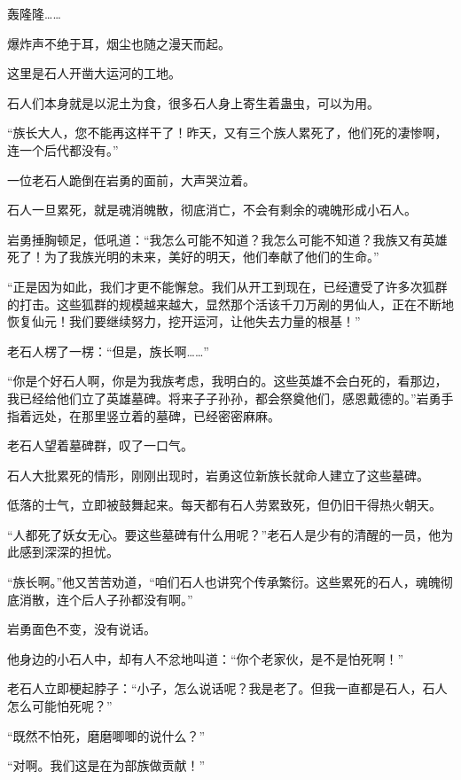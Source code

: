 
\begin{this_body}

轰隆隆……

爆炸声不绝于耳，烟尘也随之漫天而起。

这里是石人开凿大运河的工地。

石人们本身就是以泥土为食，很多石人身上寄生着蛊虫，可以为用。

“族长大人，您不能再这样干了！昨天，又有三个族人累死了，他们死的凄惨啊，连一个后代都没有。”

一位老石人跪倒在岩勇的面前，大声哭泣着。

石人一旦累死，就是魂消魄散，彻底消亡，不会有剩余的魂魄形成小石人。

岩勇捶胸顿足，低吼道：“我怎么可能不知道？我怎么可能不知道？我族又有英雄死了！为了我族光明的未来，美好的明天，他们奉献了他们的生命。”

“正是因为如此，我们才更不能懈怠。我们从开工到现在，已经遭受了许多次狐群的打击。这些狐群的规模越来越大，显然那个活该千刀万剐的男仙人，正在不断地恢复仙元！我们要继续努力，挖开运河，让他失去力量的根基！”

老石人楞了一楞：“但是，族长啊……”

“你是个好石人啊，你是为我族考虑，我明白的。这些英雄不会白死的，看那边，我已经给他们立了英雄墓碑。将来子子孙孙，都会祭奠他们，感恩戴德的。”岩勇手指着远处，在那里竖立着的墓碑，已经密密麻麻。

老石人望着墓碑群，叹了一口气。

石人大批累死的情形，刚刚出现时，岩勇这位新族长就命人建立了这些墓碑。

低落的士气，立即被鼓舞起来。每天都有石人劳累致死，但仍旧干得热火朝天。

“人都死了妖女无心。要这些墓碑有什么用呢？”老石人是少有的清醒的一员，他为此感到深深的担忧。

“族长啊。”他又苦苦劝道，“咱们石人也讲究个传承繁衍。这些累死的石人，魂魄彻底消散，连个后人子孙都没有啊。”

岩勇面色不变，没有说话。

他身边的小石人中，却有人不忿地叫道：“你个老家伙，是不是怕死啊！”

老石人立即梗起脖子：“小子，怎么说话呢？我是老了。但我一直都是石人，石人怎么可能怕死呢？”

“既然不怕死，磨磨唧唧的说什么？”

“对啊。我们这是在为部族做贡献！”


\end{this_body}
